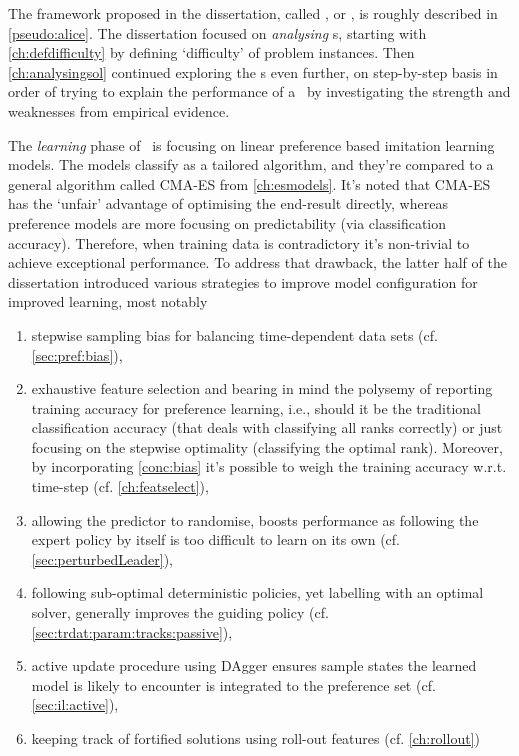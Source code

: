 

The framework proposed in the dissertation, called \fullnameAlice, or \Alice, 
is roughly described in \cref{pseudo:alice}. 
The dissertation focused on \emph{analysing} \sdr s, starting with 
\cref{ch:defdifficulty} by defining `difficulty' of problem instances. Then 
\cref{ch:analysingsol} continued exploring the \dr s even further, on  
step-by-step basis in order of trying to explain the performance 
of a \dr\ by investigating the strength and weaknesses from empirical evidence. 

The \emph{learning} phase of \Alice\ is focusing on linear preference based 
imitation learning models. The models classify as a tailored algorithm, and 
they're compared to a general algorithm called CMA-ES from \cref{ch:esmodels}. 
It's noted that CMA-ES has the `unfair' advantage of optimising the end-result 
directly, whereas preference models are more focusing on predictability (via 
classification accuracy). Therefore, when training data is contradictory it's 
non-trivial to achieve exceptional performance. 
To address that drawback, the latter half of the dissertation introduced 
various strategies to improve model configuration for improved learning, most 
notably 
\begin{enumerate}
    \item \label{conc:bias} stepwise sampling bias for balancing time-dependent 
    data sets (cf. \cref{sec:pref:bias}),
    \item exhaustive feature selection and bearing in mind the polysemy of 
    reporting training accuracy for preference learning, i.e., should it be the 
    traditional classification accuracy (that deals with classifying all ranks 
    correctly) or just focusing on the stepwise optimality (classifying the 
    optimal rank). Moreover, by incorporating \ref{conc:bias} it's possible to 
    weigh the training accuracy w.r.t. time-step 
    (cf. \cref{ch:featselect}),
    \item allowing the predictor to randomise, boosts performance as following 
    the expert policy by itself is too difficult to learn on its own (cf. 
    \cref{sec:perturbedLeader}),
    \item following sub-optimal deterministic policies, yet labelling with an 
    optimal solver, generally improves the guiding policy (cf. 
    \cref{sec:trdat:param:tracks:passive}),
    \item active update procedure using DAgger ensures sample states the 
    learned model is likely to encounter is integrated to the preference set
    (cf. \cref{sec:il:active}),
    \item keeping track of fortified solutions using roll-out features (cf. 
    \cref{ch:rollout})
\end{enumerate}
